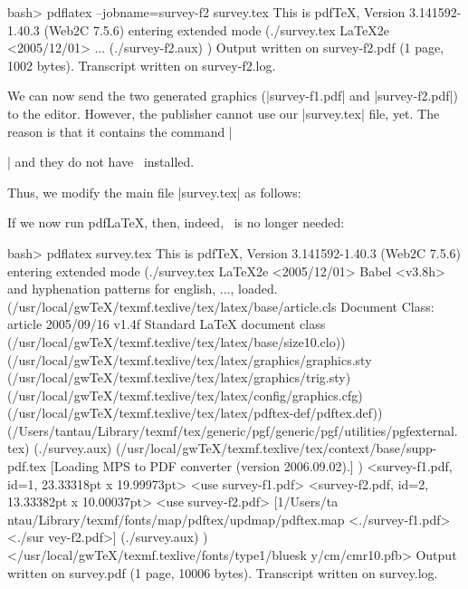 \begin{codeexample}
bash> pdflatex --jobname=survey-f2 survey.tex
This is pdfTeX, Version 3.141592-1.40.3 (Web2C 7.5.6)
entering extended mode
(./survey.tex
LaTeX2e <2005/12/01>
...
(./survey-f2.aux) )
Output written on survey-f2.pdf (1 page, 1002 bytes).
Transcript written on survey-f2.log.
\end{codeexample}

We can now send the two generated graphics (|survey-f1.pdf| and
|survey-f2.pdf|) to the editor. However, the publisher cannot use our
|survey.tex| file, yet. The reason is that it contains the command
|\usepackage{tikz}| and they do not have \pgfname\ installed.

Thus, we modify the main file |survey.tex| as follows:
If we now run pdf\LaTeX, then, indeed, \pgfname\ is no longer needed:
\begin{codeexample}
bash> pdflatex survey.tex
This is pdfTeX, Version 3.141592-1.40.3 (Web2C 7.5.6)
entering extended mode
(./survey.tex
LaTeX2e <2005/12/01>
Babel <v3.8h> and hyphenation patterns for english, ..., loaded.
(/usr/local/gwTeX/texmf.texlive/tex/latex/base/article.cls
Document Class: article 2005/09/16 v1.4f Standard LaTeX document class
(/usr/local/gwTeX/texmf.texlive/tex/latex/base/size10.clo))
(/usr/local/gwTeX/texmf.texlive/tex/latex/graphics/graphics.sty
(/usr/local/gwTeX/texmf.texlive/tex/latex/graphics/trig.sty)
(/usr/local/gwTeX/texmf.texlive/tex/latex/config/graphics.cfg)
(/usr/local/gwTeX/texmf.texlive/tex/latex/pdftex-def/pdftex.def))
(/Users/tantau/Library/texmf/tex/generic/pgf/generic/pgf/utilities/pgfexternal.
tex) (./survey.aux)
(/usr/local/gwTeX/texmf.texlive/tex/context/base/supp-pdf.tex
[Loading MPS to PDF converter (version 2006.09.02).]
) <survey-f1.pdf, id=1, 23.33318pt x 19.99973pt> <use survey-f1.pdf>
<survey-f2.pdf, id=2, 13.33382pt x 10.00037pt> <use survey-f2.pdf> [1{/Users/ta
ntau/Library/texmf/fonts/map/pdftex/updmap/pdftex.map} <./survey-f1.pdf> <./sur
vey-f2.pdf>] (./survey.aux) )</usr/local/gwTeX/texmf.texlive/fonts/type1/bluesk
y/cm/cmr10.pfb>
Output written on survey.pdf (1 page, 10006 bytes).
Transcript written on survey.log.
\end{codeexample}

